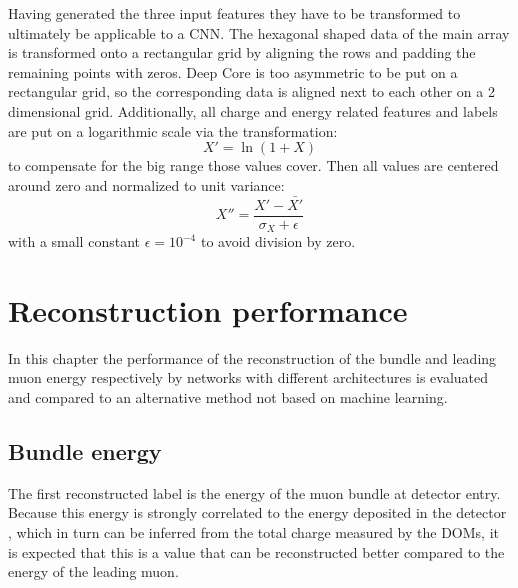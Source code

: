 \documentclass[
  tucolor,       %
  BCOR=12mm,     %
  parskip=half,  %
  open=any,      %
  cleardoublepage=plain,  %
]{tudothesis}
\begin{document}
Having generated the three input features they have to be transformed to ultimately be applicable to a CNN.
The hexagonal shaped data of the main array is transformed onto a rectangular grid by aligning the rows and padding the remaining points with zeros. Deep Core is too asymmetric to be put on a rectangular grid, so the corresponding data is aligned next to each other on a 2 dimensional grid.
Additionally, all charge and energy related features and labels are put on a logarithmic scale via the transformation:
\begin{equation}
  X'=\ln(1+X)
\end{equation}
to compensate for the big range those values cover. Then all values are centered around zero and normalized to unit variance:
\begin{equation}
  X''=\frac{X'-\bar{X'}}{\sigma_X+\epsilon}
\end{equation}
with a small constant $\epsilon=10^{-4}$ to avoid division by zero.
\cite{Abbasi_2021}
\chapter{Reconstruction performance}
In this chapter the performance of the reconstruction of the bundle and leading muon energy respectively by networks with different architectures is evaluated and compared to an alternative method not based on machine learning.
\section{Bundle energy}
The first reconstructed label is the energy of the muon bundle at detector entry.
Because this energy is strongly correlated to the energy deposited in the detector \cite{Aartsen_2014}, which in turn can be inferred from the total charge measured by the DOMs, it is expected that this is a value that can be reconstructed better compared to the energy of the leading muon.
\end{document}

